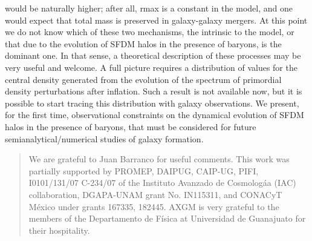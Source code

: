 \documentclass[10pt,twoside,twocolumn]{article}
\begin{document}
would be naturally higher; after all, rmax is a constant
in the model, and one would expect that total mass is
preserved in galaxy-galaxy mergers. At this point we do
not know which of these two mechanisms, the intrinsic to
the model, or that due to the evolution of SFDM halos
in the presence of baryons, is the dominant one. In that
sense, a theoretical description of these processes may be
very useful and welcome.
A full picture requires a distribution of values for the
central density generated from the evolution of the spectrum of primordial density perturbations after inflation.
Such a result is not available now, but it is possible to
start tracing this distribution with galaxy observations.
We present, for the first time, observational constraints
on the dynamical evolution of SFDM halos in the presence of baryons, that must be considered for future semianalytical/numerical studies of galaxy formation.
\vspace{-1em}

    \renewcommand{\abstractname}{\center{\small{ACKNOWLEDGEMENTS}}}
    \begin{abstract}
     We are grateful to Juan Barranco for useful comments.
This work was partially supported by PROMEP, DAIPUG, CAIP-UG, PIFI, I0101/131/07 C-234/07 of the Instituto Avanzado de Cosmologáa (IAC) collaboration,
DGAPA-UNAM grant No. IN115311, and CONACyT
México under grants 167335, 182445. AXGM is very
grateful to the members of the Departamento de Física
at Universidad de Guanajuato for their hospitality.
    
    \end{abstract}
    


    
\end{document}

